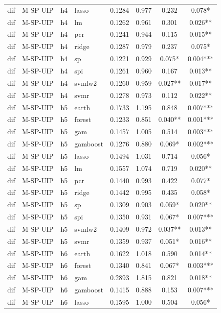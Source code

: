 \begin{ThreePartTable}
\begin{longtable}[t]{llclcccc}
dif & M-SP-UIP & h4 & lasso & 0.1284 & 0.977 & 0.232 & 0.078*\\
dif & M-SP-UIP & h4 & lm & 0.1262 & 0.961 & 0.301 & 0.026**\\
dif & M-SP-UIP & h4 & pcr & 0.1241 & 0.944 & 0.115 & 0.015**\\
dif & M-SP-UIP & h4 & ridge & 0.1287 & 0.979 & 0.237 & 0.075*\\
dif & M-SP-UIP & h4 & sp & 0.1221 & 0.929 & 0.075* & 0.004***\\
dif & M-SP-UIP & h4 & spi & 0.1261 & 0.960 & 0.167 & 0.013**\\
dif & M-SP-UIP & h4 & svmlw2 & 0.1260 & 0.959 & 0.027** & 0.017**\\
dif & M-SP-UIP & h4 & svmr & 0.1278 & 0.973 & 0.112 & 0.022**\\
\addlinespace
dif & M-SP-UIP & h5 & earth & 0.1733 & 1.195 & 0.848 & 0.007***\\
dif & M-SP-UIP & h5 & forest & 0.1233 & 0.851 & 0.040** & 0.001***\\
dif & M-SP-UIP & h5 & gam & 0.1457 & 1.005 & 0.514 & 0.003***\\
dif & M-SP-UIP & h5 & gamboost & 0.1276 & 0.880 & 0.069* & 0.002***\\
dif & M-SP-UIP & h5 & lasso & 0.1494 & 1.031 & 0.714 & 0.056*\\
dif & M-SP-UIP & h5 & lm & 0.1557 & 1.074 & 0.719 & 0.020**\\
dif & M-SP-UIP & h5 & pcr & 0.1440 & 0.993 & 0.422 & 0.077*\\
dif & M-SP-UIP & h5 & ridge & 0.1442 & 0.995 & 0.435 & 0.058*\\
dif & M-SP-UIP & h5 & sp & 0.1309 & 0.903 & 0.059* & 0.020**\\
dif & M-SP-UIP & h5 & spi & 0.1350 & 0.931 & 0.067* & 0.007***\\
dif & M-SP-UIP & h5 & svmlw2 & 0.1409 & 0.972 & 0.037** & 0.013**\\
dif & M-SP-UIP & h5 & svmr & 0.1359 & 0.937 & 0.051* & 0.016**\\
\addlinespace
dif & M-SP-UIP & h6 & earth & 0.1622 & 1.018 & 0.590 & 0.014**\\
dif & M-SP-UIP & h6 & forest & 0.1340 & 0.841 & 0.067* & 0.003***\\
dif & M-SP-UIP & h6 & gam & 0.2893 & 1.815 & 0.821 & 0.018**\\
dif & M-SP-UIP & h6 & gamboost & 0.1415 & 0.888 & 0.153 & 0.007***\\
dif & M-SP-UIP & h6 & lasso & 0.1595 & 1.000 & 0.504 & 0.056*\\

\end{longtable}
\end{ThreePartTable}
